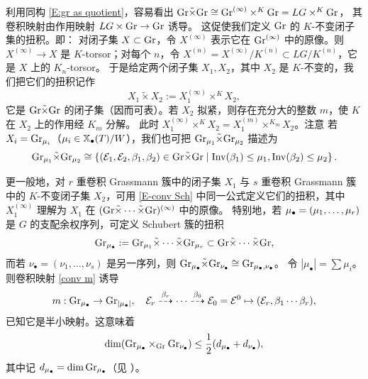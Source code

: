 利用同构 \eqref{E:gr as quotient}，容易看出 ${\operatorname{Gr}}\tilde\times{\operatorname{Gr}}\cong {\operatorname{Gr}}^{(\infty)}\times^K{\operatorname{Gr}}=LG\times^K{\operatorname{Gr}}$，
其卷积映射由作用映射 $LG\times{\operatorname{Gr}}\to {\operatorname{Gr}}$ 诱导。
这促使我们定义 ${\operatorname{Gr}}$ 的 $K$-不变闭子集的扭积。即：
对闭子集 $X\subset {\operatorname{Gr}}$，令 $X^{(\infty)}$ 表示它在 ${\operatorname{Gr}}^{(\infty)}$ 中的原像。则 $X^{(\infty)}\to X$ 是 $K$-torsor；对每个 $n$，令 $X^{(n)}=X^{(\infty)}/K^{(n)}\subset LG/K^{(n)}$，它是 $X$ 上的 $K_n$-torsor。
于是给定两个闭子集 $X_1, X_2$，其中 $X_2$ 是 $K$-不变的，我们把它们的扭积记作
\begin{equation}
\label{E-conv Sch}
X_1\tilde\times X_2:= X_1^{(\infty)}\times^K X_2,
\end{equation}
它是 ${\operatorname{Gr}}\tilde\times{\operatorname{Gr}}$ 的闭子集（因而可表）。若 $X_2$ 拟紧，则存在充分大的整数 $m$，使 $K$ 在 $X_2$ 上的作用经 $K_m$ 分解。
此时 $X_1^{(\infty)}\times^K X_2=X_1^{(m)}\times^{K_m}X_2$。注意
若 $X_i={\operatorname{Gr}}_{\mu_i}$（$\mu_i\in \mathbb{X}_\bullet(T)/W$），我们也可把 ${\operatorname{Gr}}_{\mu_1}\tilde{\times}{\operatorname{Gr}}_{\mu_2}$ 描述为
\[{\operatorname{Gr}}_{\mu_1}\tilde{\times}{\operatorname{Gr}}_{\mu_2}\cong \left\{({\mathcal E}_1,{\mathcal E}_2,\beta_1,\beta_2)\in{\operatorname{Gr}}\tilde\times{\operatorname{Gr}}\mid {\operatorname{Inv}}(\beta_1)\leq \mu_1, {\operatorname{Inv}}(\beta_2)\leq \mu_2\right\}.\]

更一般地，对 $r$ 重卷积 Grassmann 簇中的闭子集 $X_1$ 与 $s$ 重卷积 Grassmann 簇中的 $K$-不变闭子集 $X_2$，可用 \eqref{E-conv Sch} 中同一公式定义它们的扭积，其中 $X_1^{(\infty)}$ 理解为 $X_1$ 在 $({\operatorname{Gr}}\tilde\times\cdots\tilde\times{\operatorname{Gr}})^{(\infty)}$ 中的原像。
特别地，若 ${\mu_\bullet}=(\mu_1,\ldots,\mu_r)$ 是 $G$ 的支配余权序列，可定义 Schubert 簇的扭积
$${\operatorname{Gr}}_{{\mu_\bullet}}:={\operatorname{Gr}}_{\mu_1}\tilde\times\cdots\tilde\times{\operatorname{Gr}}_{\mu_r}\subset{\operatorname{Gr}}\tilde\times\cdots\tilde\times{\operatorname{Gr}},$$
而若 $\nu_\bullet=(\nu_1,\ldots,\nu_s)$ 是另一序列，则 ${\operatorname{Gr}}_{{\mu_\bullet}}\tilde\times{\operatorname{Gr}}_{\nu_\bullet}\cong{\operatorname{Gr}}_{{\mu_\bullet},\nu_\bullet}$。
令 $|\mu_\bullet|=\sum \mu_i$。则卷积映射 \eqref{conv m} 诱导
\begin{equation}\label{conv m2}
m: {\operatorname{Gr}}_{\mu_\bullet}\to {\operatorname{Gr}}_{|\mu_\bullet|}, \quad {\mathcal E}_r\stackrel{\beta_r}{\dashrightarrow}\cdots\stackrel{\beta_0}{\dashrightarrow}{\mathcal E}_0={\mathcal E}^0\mapsto ({\mathcal E}_r,\beta_1\cdots\beta_r),
\end{equation}
已知它是半小映射。这意味着
\begin{equation}
\label{E:dim est}
\dim ({\operatorname{Gr}}_{{\mu_\bullet}}\times_{\operatorname{Gr}}{\operatorname{Gr}}_{\nu_\bullet})\leq \frac{1}{2}(d_{{\mu_\bullet}}+d_{\nu_\bullet}),
\end{equation}
其中记 $d_{{\mu_\bullet}}=\dim {\operatorname{Gr}}_{{\mu_\bullet}}$（见 \cite[命题 3.1.10]{XZ}）。

